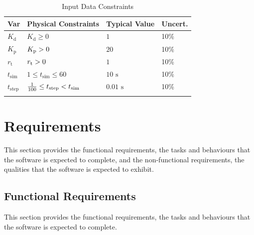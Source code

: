 \documentclass[12pt]{article}
\newcommand{\gt}{\ensuremath >}
\newcommand{\lt}{\ensuremath <}
\begin{document}
\begin{longtable}{l l l l}
\toprule
\textbf{Var} & \textbf{Physical Constraints} & \textbf{Typical Value} & \textbf{Uncert.}
\\
\midrule
\endhead
${K_{\text{d}}}$ & ${K_{\text{d}}}\geq{}0$ & $1$ & 10$\%$
\\
${K_{\text{p}}}$ & ${K_{\text{p}}}\gt{}0$ & $20$ & 10$\%$
\\
${r_{\text{t}}}$ & ${r_{\text{t}}}\gt{}0$ & $1$ & 10$\%$
\\
${t_{\text{sim}}}$ & $1\leq{}{t_{\text{sim}}}\leq{}60$ & $10$ ${\text{s}}$ & 10$\%$
\\
${t_{\text{step}}}$ & $\frac{1}{100}\leq{}{t_{\text{step}}}\lt{}{t_{\text{sim}}}$ & $0.01$ ${\text{s}}$ & 10$\%$
\\
\bottomrule
\caption{Input Data Constraints}
\label{Table:InDataConstraints}
\end{longtable}
\section{Requirements}
\label{Sec:Requirements}
This section provides the functional requirements, the tasks and behaviours that the software is expected to complete, and the non-functional requirements, the qualities that the software is expected to exhibit.

\subsection{Functional Requirements}
\label{Sec:FRs}
This section provides the functional requirements, the tasks and behaviours that the software is expected to complete.
\end{document}
